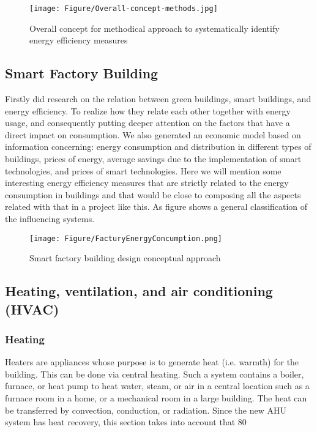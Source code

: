 \begin{figure}[h!]
	\centering
	\texttt{[image: Figure/Overall-concept-methods.jpg]}
	\caption{Overall concept for methodical approach to systematically identify energy efficiency measures}
	\label{fig:overalconcept}
\end{figure}


\subsection{Smart Factory Building}
Firstly did research on the relation between green buildings, smart buildings, and energy efficiency. To realize how they relate each other together with energy usage, and consequently putting deeper attention on the factors that have a direct impact on consumption. We also generated an economic model based on information concerning: energy consumption and distribution in different types of buildings, prices of energy, average savings due to the implementation of smart technologies, and prices of smart technologies. 
Here we will mention some interesting energy efficiency measures that are strictly related to the energy consumption in buildings and that would be close to composing all the aspects related with that in a project like this. As figure shows a general classification of the influencing systems.

\begin{figure}[h!]
	\centering
	\texttt{[image: Figure/FacturyEnergyConcumption.png]}
	\caption{Smart factory building design conceptual approach}
	\label{fig:factoryenergyconsumption}
\end{figure}


\subsection{Heating, ventilation, and air conditioning (HVAC)}

\subsubsection{Heating }
Heaters are appliances whose purpose is to generate heat (i.e. warmth) for the building. This can be done via central heating. Such a system contains a boiler, furnace, or heat pump to heat water, steam, or air in a central location such as a furnace room in a home, or a mechanical room in a large building. The heat can be transferred by convection, conduction, or radiation. Since the new AHU system has heat recovery, this section takes into account that 80%

